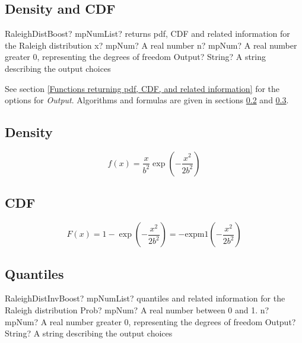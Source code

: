 \subsection{Density and CDF}

\begin{mpFunctionsExtract}
	\mpFunctionThree
	{RaleighDistBoost? mpNumList? returns pdf, CDF and related information for the Raleigh distribution}
	{x? mpNum? A real number}
	{n? mpNum? A real number greater 0, representing the degrees of freedom}
	{Output? String? A string describing the output choices}
\end{mpFunctionsExtract}


\vspace{0.3cm}
See section \ref{Functions returning pdf, CDF, and related information} for the options for {\itshape\sffamily Output}. Algorithms and formulas are given in sections \ref{RaleighDistributionDensity} and \ref{RaleighDistributionCDF}.


\subsection{Density}
\label{RaleighDistributionDensity}

\begin{equation} 
	f(x)= \frac{x}{b^2} \exp \left(- \frac{x^2}{2b^2}\right)
\end{equation}


\subsection{CDF}
\label{RaleighDistributionCDF}

\begin{equation} 
	F(x)= 1 - \exp \left(- \frac{x^2}{2b^2}\right)
	= -\text{expm1} \left(- \frac{x^2}{2b^2}\right)
\end{equation}



\subsection{Quantiles}

\begin{mpFunctionsExtract}
	\mpFunctionThree
	{RaleighDistInvBoost? mpNumList? quantiles and related information for the Raleigh distribution}
	{Prob? mpNum? A real number between 0 and 1.}
	{n? mpNum? A real number greater 0, representing the degrees of freedom}
	{Output? String? A string describing the output choices}
\end{mpFunctionsExtract}

